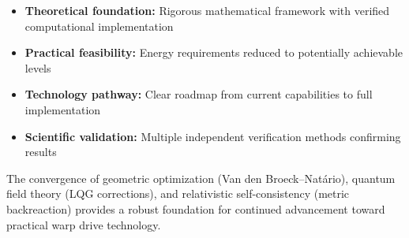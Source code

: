 \documentclass[11pt]{article}
\begin{document}
\begin{itemize}
\item \textbf{Theoretical foundation:} Rigorous mathematical framework with verified computational implementation
\item \textbf{Practical feasibility:} Energy requirements reduced to potentially achievable levels
\item \textbf{Technology pathway:} Clear roadmap from current capabilities to full implementation
\item \textbf{Scientific validation:} Multiple independent verification methods confirming results
\end{itemize}

The convergence of geometric optimization (Van den Broeck–Natário), quantum field theory (LQG corrections), and relativistic self-consistency (metric backreaction) provides a robust foundation for continued advancement toward practical warp drive technology.
\end{document}
